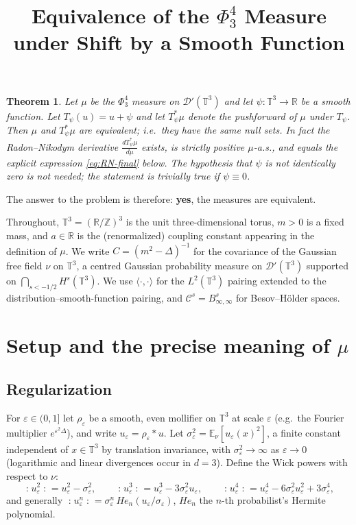 \documentclass[12pt]{article}
\title{Equivalence of the $\Phi^4_3$ Measure under Shift by a Smooth Function}
\author{}
\date{}
\newcommand{\bR}{\mathbb{R}}
\newcommand{\bT}{\mathbb{T}}
\newcommand{\bE}{\mathbb{E}}
\newcommand{\bZ}{\mathbb{Z}}
\newcommand{\cD}{\mathcal{D}}
\newcommand{\eps}{\varepsilon}
\newcommand{\Wick}[1]{\mathopen{:}#1\mathclose{:}}
\theoremstyle{plain}
\newtheorem{theorem}{Theorem}
\theoremstyle{definition}
\begin{document}
\maketitle

\begin{theorem}\label{thm:main}
Let $\mu$ be the $\Phi^4_3$ measure on $\cD'(\bT^3)$ and let $\psi\colon\bT^3\to\bR$
be a smooth function. Let $T_\psi(u)=u+\psi$ and let $T_\psi^*\mu$ denote the
pushforward of $\mu$ under $T_\psi$. Then $\mu$ and $T_\psi^*\mu$ are equivalent;
i.e.\ they have the same null sets. In fact the Radon--Nikodym derivative
$\frac{dT_\psi^*\mu}{d\mu}$ exists, is strictly positive $\mu$-a.s., and equals
the explicit expression \eqref{eq:RN-final} below. The hypothesis that $\psi$
is not identically zero is not needed; the statement is trivially true if
$\psi\equiv0$.
\end{theorem}

The answer to the problem is therefore: \textbf{yes}, the measures are equivalent.

\medskip

Throughout, $\bT^3=(\bR/\bZ)^3$ is the unit three-dimensional torus, $m>0$ is a
fixed mass, and $a\in\bR$ is the (renormalized) coupling constant appearing in
the definition of $\mu$. We write $C=(m^2-\Delta)^{-1}$ for the covariance of the
Gaussian free field $\nu$ on $\bT^3$, a centred Gaussian probability measure on
$\cD'(\bT^3)$ supported on $\bigcap_{s<-1/2}H^s(\bT^3)$. We use $\langle\cdot,\cdot\rangle$
for the $L^2(\bT^3)$ pairing extended to the distribution--smooth-function pairing,
and $\mathcal C^s=B^s_{\infty,\infty}$ for Besov--H\"older spaces.

\section{Setup and the precise meaning of $\mu$}\label{sec:setup}

\subsection{Regularization}
For $\eps\in(0,1]$ let $\rho_\eps$ be a smooth, even mollifier on $\bT^3$ at scale
$\eps$ (e.g.\ the Fourier multiplier $e^{\eps^2\Delta}$), and write
$u_\eps=\rho_\eps*u$. Let $\sigma_\eps^2=\bE_\nu[u_\eps(x)^2]$, a finite constant
independent of $x\in\bT^3$ by translation invariance, with $\sigma_\eps^2\to\infty$
as $\eps\to0$ (logarithmic and linear divergences occur in $d=3$). Define the Wick
powers with respect to $\nu$:
\begin{equation}\label{eq:wick}
\Wick{u_\eps^2}=u_\eps^2-\sigma_\eps^2,\qquad
\Wick{u_\eps^3}=u_\eps^3-3\sigma_\eps^2 u_\eps,\qquad
\Wick{u_\eps^4}=u_\eps^4-6\sigma_\eps^2 u_\eps^2+3\sigma_\eps^4 ,
\end{equation}
and generally $\Wick{u_\eps^n}=\sigma_\eps^{n}\,He_n(u_\eps/\sigma_\eps)$, $He_n$
the $n$-th probabilist's Hermite polynomial.
\end{document}
